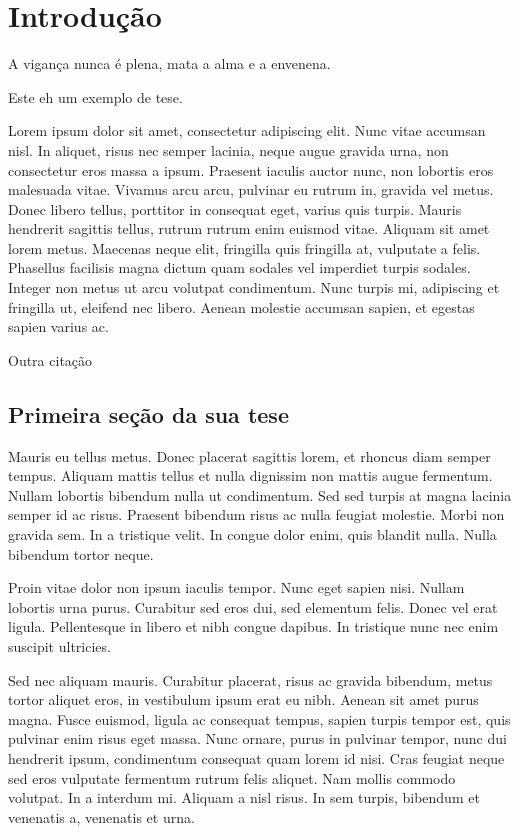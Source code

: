 \chapter{Introdu\c{c}\~ao}
\label{chap:intro}

\begin{epigrafe}
	A vigan\c{c}a nunca \'e plena, mata a alma e a envenena.
	
\end{epigrafe}

Este eh um exemplo de tese. \cite{bastard1988, myself1stschoolspintronicap21,Crutchfieldnp8172012}

Lorem ipsum dolor sit amet, consectetur adipiscing elit. Nunc vitae accumsan nisl. In aliquet, risus nec semper lacinia, neque augue gravida urna, non consectetur eros massa a ipsum. Praesent iaculis auctor nunc, non lobortis eros malesuada vitae. Vivamus arcu arcu, pulvinar eu rutrum in, gravida vel metus. Donec libero tellus, porttitor in consequat eget, varius quis turpis. Mauris hendrerit sagittis tellus, rutrum rutrum enim euismod vitae. Aliquam sit amet lorem metus. Maecenas neque elit, fringilla quis fringilla at, vulputate a felis. Phasellus facilisis magna dictum quam sodales vel imperdiet turpis sodales. Integer non metus ut arcu volutpat condimentum. Nunc turpis mi, adipiscing et fringilla ut, eleifend nec libero. Aenean molestie accumsan sapien, et egestas sapien varius ac.

Outra cita\c{c}\~ao\cite{PhysRevB.76.195439}

\section{Primeira se\c{c}\~ao da sua tese}

Mauris eu tellus metus. Donec placerat sagittis lorem, et rhoncus diam semper tempus. Aliquam mattis tellus et nulla dignissim non mattis augue fermentum. Nullam lobortis bibendum nulla ut condimentum. Sed sed turpis at magna lacinia semper id ac risus. Praesent bibendum risus ac nulla feugiat molestie. Morbi non gravida sem. In a tristique velit. In congue dolor enim, quis blandit nulla. Nulla bibendum tortor neque.

Proin vitae dolor non ipsum iaculis tempor. Nunc eget sapien nisi. Nullam lobortis urna purus. Curabitur sed eros dui, sed elementum felis. Donec vel erat ligula. Pellentesque in libero et nibh congue dapibus. In tristique nunc nec enim suscipit ultricies.

Sed nec aliquam mauris. Curabitur placerat, risus ac gravida bibendum, metus tortor aliquet eros, in vestibulum ipsum erat eu nibh. Aenean sit amet purus magna. Fusce euismod, ligula ac consequat tempus, sapien turpis tempor est, quis pulvinar enim risus eget massa. Nunc ornare, purus in pulvinar tempor, nunc dui hendrerit ipsum, condimentum consequat quam lorem id nisi. Cras feugiat neque sed eros vulputate fermentum rutrum felis aliquet. Nam mollis commodo volutpat. In a interdum mi. Aliquam a nisl risus. In sem turpis, bibendum et venenatis a, venenatis et urna.

